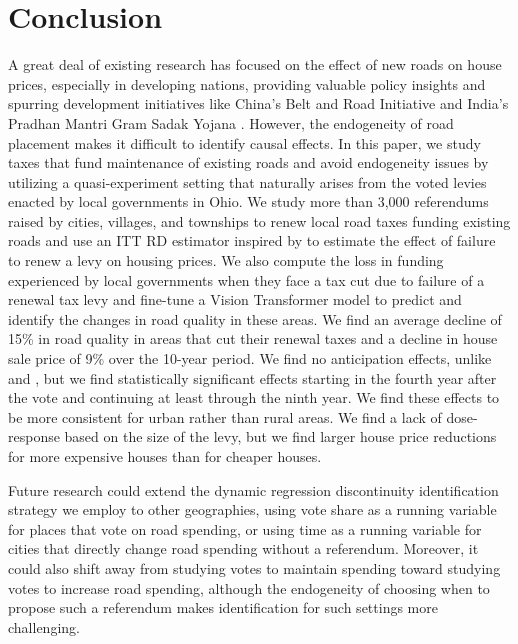 \section{Conclusion} \label{sec:conclusion}

A great deal of existing research has focused on the effect of new roads on house prices, especially in developing nations, providing valuable policy insights and spurring development initiatives like China’s Belt and Road Initiative \citep{huang2016understanding} and India’s Pradhan Mantri Gram Sadak Yojana \citep{asher2020}. However, the endogeneity of road placement makes it difficult to identify causal effects. In this paper, we study taxes that fund maintenance of existing roads and avoid endogeneity issues by utilizing a quasi-experiment setting that naturally arises from the voted levies enacted by local governments in Ohio. We study more than 3,000 referendums raised by cities, villages, and townships to renew local road taxes funding existing roads and use an ITT RD estimator inspired by \cite{cellini2010value} to estimate the effect of failure to renew a levy on housing prices. We also compute the loss in funding experienced by local governments when they face a tax cut due to failure of a renewal tax levy and fine-tune a Vision Transformer model to predict and identify the changes in road quality in these areas. We find an average decline of 15\% in road quality in areas that cut their renewal taxes and a decline in house sale price of 9\% over the 10-year period. We find no anticipation effects, unlike \cite{beenstock2016hedonic} and \cite{diao2017spatial}, but we find statistically significant effects starting in the fourth year after the vote and continuing at least through the ninth year. We find these effects to be more consistent for urban rather than rural areas. We find a lack of dose-response based on the size of the levy, but we find larger house price reductions for more expensive houses than for cheaper houses.  

Future research could extend the dynamic regression discontinuity identification strategy we employ to other geographies, using vote share as a running variable for places that vote on road spending, or using time as a running variable for cities that directly change road spending without a referendum. Moreover, it could also shift away from studying votes to maintain spending toward studying votes to increase road spending, although the endogeneity of choosing when to propose such a referendum makes identification for such settings more challenging.


